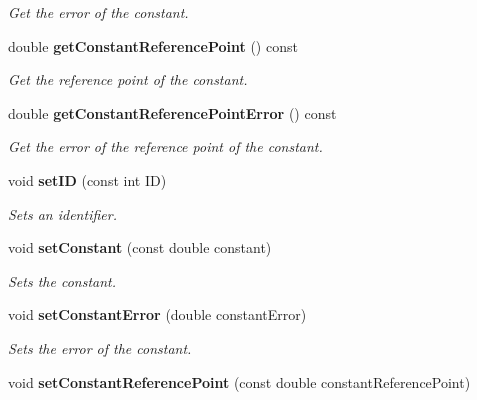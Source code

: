 \begin{DoxyCompactItemize}
\begin{DoxyCompactList}\small\item\em Get the error of the constant. \item\end{DoxyCompactList}\item 
double {\bf getConstantReferencePoint} () const \label{classCALICE_1_1LinearFitConstant_aa8748414106f0a3dc6bf7b5f406e2b88}

\begin{DoxyCompactList}\small\item\em Get the reference point of the constant. \item\end{DoxyCompactList}\item 
double {\bf getConstantReferencePointError} () const \label{classCALICE_1_1LinearFitConstant_a7c977c3a9db317ed19f895e047fc02a2}

\begin{DoxyCompactList}\small\item\em Get the error of the reference point of the constant. \item\end{DoxyCompactList}\item 
void {\bf setID} (const int ID)\label{classCALICE_1_1LinearFitConstant_a2c386d168d63ee9cf76f2381401daaa0}

\begin{DoxyCompactList}\small\item\em Sets an identifier. \item\end{DoxyCompactList}\item 
void {\bf setConstant} (const double constant)\label{classCALICE_1_1LinearFitConstant_a3b016378df601216e55545308334e1d8}

\begin{DoxyCompactList}\small\item\em Sets the constant. \item\end{DoxyCompactList}\item 
void {\bf setConstantError} (double constantError)\label{classCALICE_1_1LinearFitConstant_aa096484667f26f82589cc0745310564d}

\begin{DoxyCompactList}\small\item\em Sets the error of the constant. \item\end{DoxyCompactList}\item 
void {\bf setConstantReferencePoint} (const double constantReferencePoint)\label{classCALICE_1_1LinearFitConstant_aad5420fa51f86f5fc8a038b97794289b}


\end{DoxyCompactItemize}
